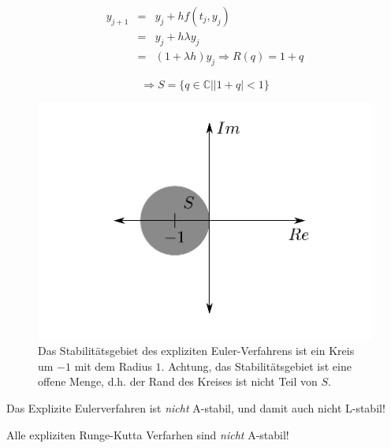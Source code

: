 \documentclass[10pt,a4paper]{article}
\begin{document}
\begin{bsp}
\begin{eqnarray*}
y_{j+1}&=&y_j + hf(t_j,y_j)\\
& =& y_j + h \lambda y_j \\
&=& (1 + \lambda h)y_j 
\Rightarrow R(q) = 1 + q
\end{eqnarray*}

$$\Rightarrow S=\{ q \in \mathbb{C} | |1+q| < 1 \}$$


\begin{figure}[H]
\includegraphics[width=\textwidth]{images/stability_explicit_euler}
\caption{Das Stabilitätsgebiet des expliziten Euler-Verfahrens ist ein Kreis um $-1$ mit dem Radius $1$. Achtung, das Stabilitätsgebiet ist eine offene Menge, d.h. der Rand des Kreises ist nicht Teil von $S$.}
\end{figure}


Das Explizite Eulerverfahren ist \emph{nicht} A-stabil, und damit auch nicht L-stabil!

\end{bsp}


\begin{satz}
Alle expliziten Runge-Kutta Verfarhen sind \emph{nicht} A-stabil!
\end{satz}
\end{document}
